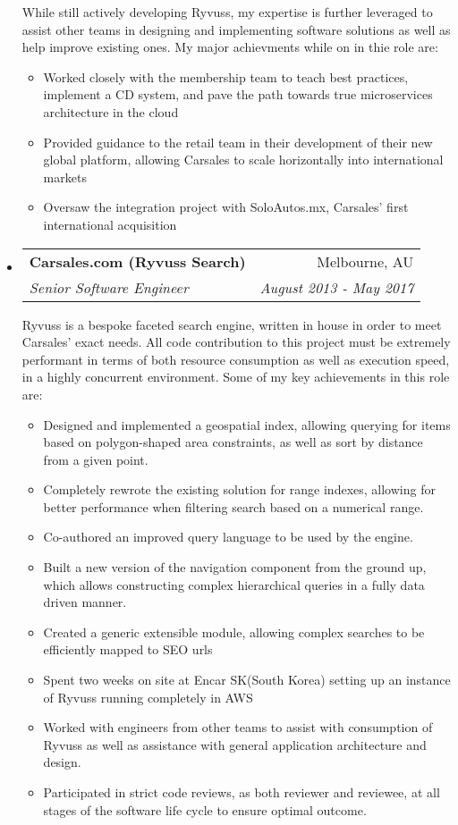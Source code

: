 \documentclass[letterpaper,11pt]{article}
\makeatletter
\newcommand{\resitem}[1]{\item #1 \vspace{-2pt}}
\newcommand{\ressubheading}[4]{
\begin{tabular*}{6.5in}{l@{\cftdotfill{\cftsecdotsep}\extracolsep{\fill}}r}
		\textbf{#1} & #2 \\
		\textit{#3} & \textit{#4} \\
\end{tabular*}\vspace{-6pt}}
\makeatother
\begin{document}
\begin{itemize}
	While still actively developing Ryvuss, my expertise is further leveraged to assist other teams in designing and implementing software solutions as well as help improve existing ones. My major achievments while on in thie role are:
	\begin{itemize}
		\resitem{Worked closely with the membership team to teach best practices, implement a CD system, and pave the path towards true microservices architecture in the cloud}
		\resitem{Provided guidance to the retail team in their development of their new global platform, allowing Carsales to scale horizontally into international markets}
		\resitem{Oversaw the integration project with SoloAutos.mx, Carsales' first international acquisition}
	\end{itemize}
	
\item
	\ressubheading{Carsales.com (Ryvuss Search)}{Melbourne, AU}{Senior Software Engineer}{August 2013 - May 2017}
	
	Ryvuss is a bespoke faceted search engine, written in house in order to meet Carsales' exact needs. All code contribution to this project must be extremely performant in terms of both resource consumption as well as execution speed, in a highly concurrent environment. Some of my key achievements in this role are:

	\begin{itemize}
		\resitem{Designed and implemented a geospatial index, allowing querying for items based on polygon-shaped area constraints, as well as sort by distance from a given point.}
		\resitem{Completely rewrote the existing solution for range indexes, allowing for better performance when filtering search based on a numerical range.}
		\resitem{Co-authored an improved query language to be used by the engine.}
		\resitem{Built a new version of the navigation component from the ground up, which allows constructing complex hierarchical queries in a fully data driven manner.}
		\resitem{Created a generic extensible module, allowing complex searches to be efficiently mapped to SEO urls}
		\resitem{Spent two weeks on site at Encar SK(South Korea) setting up an instance of Ryvuss running completely in AWS}
		\resitem{Worked with engineers from other teams to assist with consumption of Ryvuss as well as assistance with general application architecture and design.}
		\resitem{Participated in strict code reviews, as both reviewer and reviewee, at all stages of the software life cycle to ensure optimal outcome.}
	\end{itemize}


\end{itemize}
\end{document}
